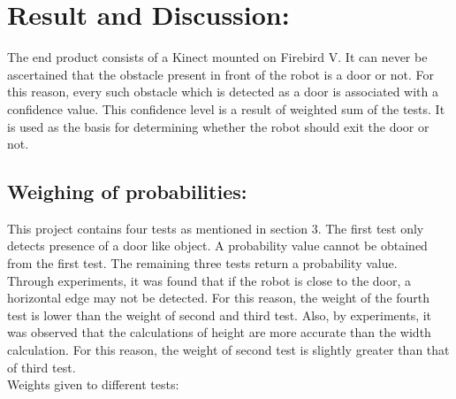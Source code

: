 \documentclass{report}
\begin{document}
\chapter{Result and Discussion:} 
The end product consists of a Kinect mounted on Firebird V. It can never be ascertained that the obstacle present in front of
the robot is a door or not. For this reason, every such obstacle which is detected as a door is associated with a confidence
value. This confidence level is a result of weighted sum of the tests. It is used as the basis for determining whether the robot
should exit the door or not.

\section{Weighing of probabilities:}

This project contains four tests as mentioned in section 3. The first test only detects presence of a door like object. A probability
value cannot be obtained from the first test. The remaining three tests return a probability value. \\
Through experiments, it was found that
if the robot is close to the door, a horizontal edge may not be detected. For this reason, the weight of the fourth test is lower than the weight of second and third test.
Also, by experiments, it was observed that the calculations of height are more accurate than the width calculation. For this reason, the weight of
second test is slightly greater than that of third test.\\
Weights given to  different tests:\\
\pagebreak
\end{document}
